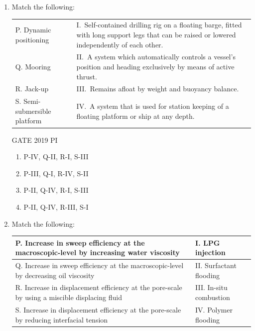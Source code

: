 \documentclass[journal,12pt,onecolumn]{IEEEtran}
\theoremstyle{remark}
\begin{document}
\begin{enumerate}
\item Match the following:

\begin{tabular}{ll}
P. Dynamic positioning        & I.\ Self-contained drilling rig on a floating barge, fitted with long support legs that can be raised or lowered independently of each other. \\
Q. Mooring                   & II.\ A system which automatically controls a vessel's position and heading exclusively by means of active thrust. \\
R. Jack-up                   & III.\ Remains afloat by weight and buoyancy balance. \\
S. Semi-submersible platform & IV.\ A system that is used for station keeping of a floating platform or ship at any depth. \\
\end{tabular}

\hfill{GATE 2019 PI}

\begin{multicols}{2}
\begin{enumerate}
    \item P-IV, Q-II, R-I, S-III
    \item P-III, Q-I, R-IV, S-II
    \item P-II, Q-IV, R-I, S-III
    \item P-II, Q-IV, R-III, S-I
\end{enumerate}
\end{multicols}
\item Match the following:

\begin{center}
\begin{tabular}{|p{}|p{}|}
\hline
P. Increase in sweep efficiency at the macroscopic-level by increasing water viscosity & I. LPG injection \\
\hline
Q. Increase in sweep efficiency at the macroscopic-level by decreasing oil viscosity & II. Surfactant flooding \\
\hline
R. Increase in displacement efficiency at the pore-scale by using a miscible displacing fluid & III. In-situ combustion \\
\hline
S. Increase in displacement efficiency at the pore-scale by reducing interfacial tension & IV. Polymer flooding \\
\hline
\end{tabular}
\end{center}


\end{enumerate}
\end{document}
